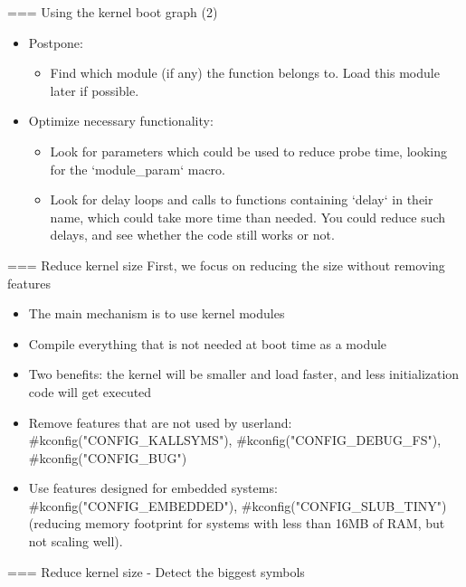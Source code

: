 === Using the kernel boot graph (2)
\begin{itemize}
\item Postpone:
      \begin{itemize}
      \item Find which module (if any) the function belongs to.
            Load this module later if possible.
      \end{itemize}
\item Optimize necessary functionality:
      \begin{itemize}
      \item Look for parameters which could be used to reduce probe time,
            looking for the `module_param` macro.
      \item Look for delay loops and calls to functions containing
            `delay` in their name, which could take more time than
            needed. You could reduce such delays, and see whether the
            code still works or not.
      \end{itemize}
\end{itemize}


=== Reduce kernel size First, we focus on reducing the size without removing features
\begin{itemize}
	\item The main mechanism is to use kernel modules
	\item Compile everything that is not needed at boot time as a
		module
	\item Two benefits: the kernel will be smaller and load faster, and
		less initialization code will get executed
	\item Remove features that are not used by userland:
		#kconfig("CONFIG_KALLSYMS"), #kconfig("CONFIG_DEBUG_FS"),
		#kconfig("CONFIG_BUG")
	\item Use features designed for embedded systems:
	      #kconfig("CONFIG_EMBEDDED"), #kconfig("CONFIG_SLUB_TINY")
	      (reducing memory footprint for systems with less than 16MB
	      of RAM, but not scaling well).
\end{itemize}


=== Reduce kernel size - Detect the biggest symbols
\footnotesize

